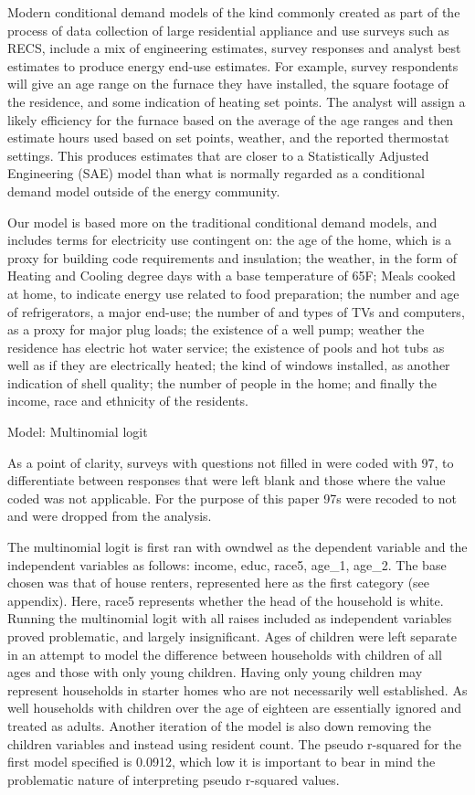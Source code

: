 \documentclass{article}
\begin{document}
  
  
Modern conditional demand models of the kind commonly created as part of the process of data collection of large residential appliance and use surveys such as RECS, include a mix of engineering estimates, survey responses and analyst best estimates to produce energy end-use estimates.  For example, survey respondents will give an age range on the furnace they have installed, the square footage of the residence, and some indication of heating set points.  The analyst will assign a likely efficiency for the furnace based on the average of the age ranges and then estimate hours used based on set points, weather, and the reported thermostat settings.  This produces estimates that are closer to a Statistically Adjusted Engineering (SAE) model than what is normally regarded as a conditional demand model outside of the energy community.

Our model is based more on the traditional conditional demand models, and includes terms for electricity use contingent on: the age of the home, which is a proxy for building code requirements and insulation; the weather, in the form of Heating and Cooling degree days with a base temperature of 65F; Meals cooked at home, to indicate energy use related to food preparation; the number and age of refrigerators, a major end-use;  the number of and types of TVs and computers, as a proxy for major plug loads; the existence of a well pump; weather the residence has electric hot water service; the existence of pools and hot tubs as well as if they are electrically heated; the kind of windows installed, as another indication of shell quality; the number of people in the home; and finally the income, race and ethnicity of the residents.  


Model: Multinomial logit

As a point of clarity, surveys with questions not filled in were coded with 97, to differentiate between responses that were left blank and those where the value coded was not applicable.  For the purpose of this paper 97s were recoded to not and were dropped from the analysis.  

The multinomial logit is first ran with owndwel as the dependent variable and the independent variables as follows: income, educ, race5, age_1, age_2.  The base chosen was that of house renters, represented here as the first category (see appendix).  Here, race5 represents whether the head of the household is white.  Running the multinomial logit with all raises included as independent variables proved problematic, and largely insignificant.  Ages of children were left separate in an attempt to model the difference between households with children of all ages and those with only young children.  Having only young children may represent households in starter homes who are not necessarily well established.  As well households with children over the age of eighteen are essentially ignored and treated as adults.  Another iteration of the model is also down removing the children variables and instead using resident count.
The pseudo r-squared for the first model specified is 0.0912, which low it is important to bear in mind the problematic nature of interpreting pseudo r-squared values.  
\end{document}
